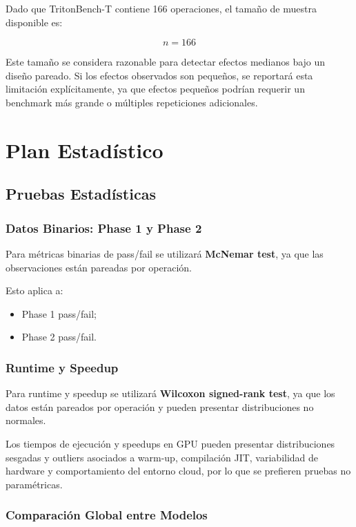 \documentclass[12pt]{article}
\begin{document}
Dado que TritonBench-T contiene 166 operaciones, el tamaño de muestra disponible es:

\[
n = 166
\]

Este tamaño se considera razonable para detectar efectos medianos bajo un diseño pareado. Si los efectos observados son pequeños, se reportará esta limitación explícitamente, ya que efectos pequeños podrían requerir un benchmark más grande o múltiples repeticiones adicionales.

\section{Plan Estadístico}

\subsection{Pruebas Estadísticas}

\subsubsection*{Datos Binarios: Phase 1 y Phase 2}

Para métricas binarias de pass/fail se utilizará \textbf{McNemar test}, ya que las observaciones están pareadas por operación.

Esto aplica a:

\begin{itemize}
    \item Phase 1 pass/fail;
    \item Phase 2 pass/fail.
\end{itemize}

\subsubsection*{Runtime y Speedup}

Para runtime y speedup se utilizará \textbf{Wilcoxon signed-rank test}, ya que los datos están pareados por operación y pueden presentar distribuciones no normales.

Los tiempos de ejecución y speedups en GPU pueden presentar distribuciones sesgadas y outliers asociados a warm-up, compilación JIT, variabilidad de hardware y comportamiento del entorno cloud, por lo que se prefieren pruebas no paramétricas.

\subsubsection*{Comparación Global entre Modelos}
\end{document}
